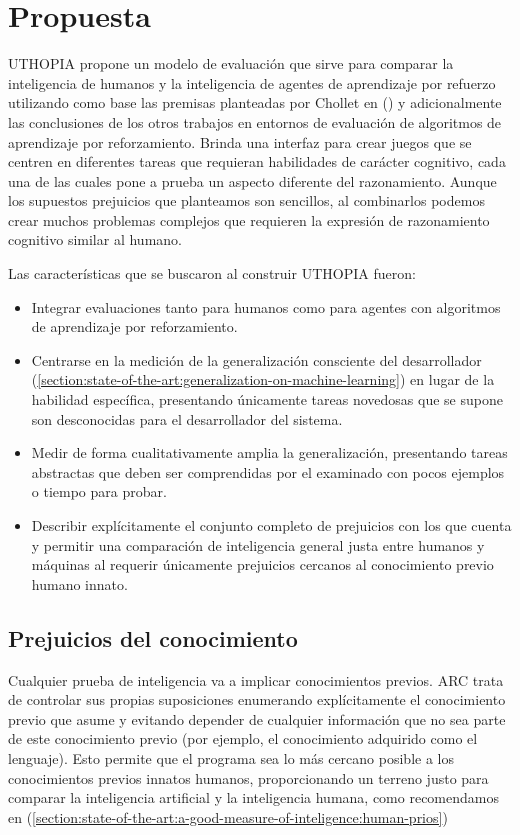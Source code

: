 \chapter{Propuesta}\label{chapter:proposal}

UTHOPIA propone un modelo de evaluación que sirve para comparar la inteligencia de humanos y la inteligencia de agentes de aprendizaje por refuerzo utilizando como base las premisas planteadas por Chollet en (\cite{chollet2019measure}) y adicionalmente las conclusiones de los otros trabajos en entornos de evaluación de algoritmos de aprendizaje por reforzamiento. Brinda una interfaz para crear juegos que se centren en diferentes tareas que requieran habilidades de carácter cognitivo, cada una de las cuales pone a prueba un aspecto diferente del razonamiento. Aunque los supuestos prejuicios que planteamos son sencillos, al combinarlos podemos crear muchos problemas complejos que requieren la expresión de razonamiento cognitivo similar al humano.

Las características que se buscaron al construir UTHOPIA fueron:

\begin{itemize}
    \item Integrar evaluaciones tanto para humanos como para agentes con algoritmos de aprendizaje por reforzamiento.
    \item Centrarse en la medición de la generalización consciente del desarrollador (\ref{section:state-of-the-art:generalization-on-machine-learning}) en lugar de la habilidad específica, presentando únicamente tareas novedosas que se supone son desconocidas para el desarrollador del sistema.
    \item Medir de forma cualitativamente amplia la generalización, presentando tareas abstractas que deben ser comprendidas por el examinado con pocos ejemplos o tiempo para probar.
    \item Describir explícitamente el conjunto completo de prejuicios con los que cuenta y permitir una comparación de inteligencia general justa entre humanos y máquinas al requerir únicamente prejuicios cercanos al conocimiento previo humano innato.
\end{itemize}

\section{Prejuicios del conocimiento} 

Cualquier prueba de inteligencia va a implicar conocimientos previos. ARC trata de controlar sus propias suposiciones enumerando explícitamente el conocimiento previo que asume y evitando depender de cualquier información que no sea parte de este conocimiento previo (por ejemplo, el conocimiento adquirido como el lenguaje). Esto permite que el programa sea lo más cercano posible a los conocimientos previos innatos humanos, proporcionando un terreno justo para comparar la inteligencia artificial y la inteligencia humana, como recomendamos en (\ref{section:state-of-the-art:a-good-measure-of-inteligence:human-prios})

